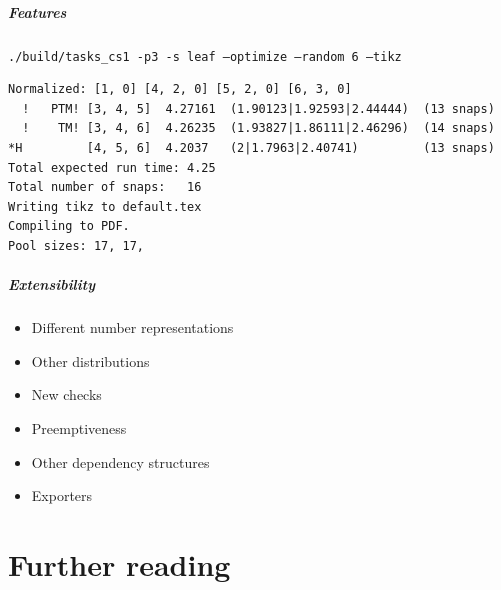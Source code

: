 \documentclass{beamer}
\begin{document}
\begin{frame}
  \frametitle{Features}
  \texttt{./build/tasks\_cs1 -p3 -s leaf --optimize --random 6 --tikz}
\begin{verbatim}
Normalized:	[1, 0] [4, 2, 0] [5, 2, 0] [6, 3, 0]
  !   PTM! [3, 4, 5]  4.27161  (1.90123|1.92593|2.44444)  (13 snaps)
  !    TM! [3, 4, 6]  4.26235  (1.93827|1.86111|2.46296)  (14 snaps)
*H         [4, 5, 6]  4.2037   (2|1.7963|2.40741)         (13 snaps)
Total expected run time: 4.25
Total number of snaps:   16
Writing tikz to default.tex
Compiling to PDF.
Pool sizes: 17, 17,
\end{verbatim}
\end{frame}

\begin{frame}
  \frametitle{Extensibility}
  \begin{itemize}
  \item Different number representations
  \item Other distributions
  \item New checks
  \item Preemptiveness
  \item Other dependency structures
  \item Exporters
  \end{itemize}
\end{frame}

\part{Further reading}

\end{document}
